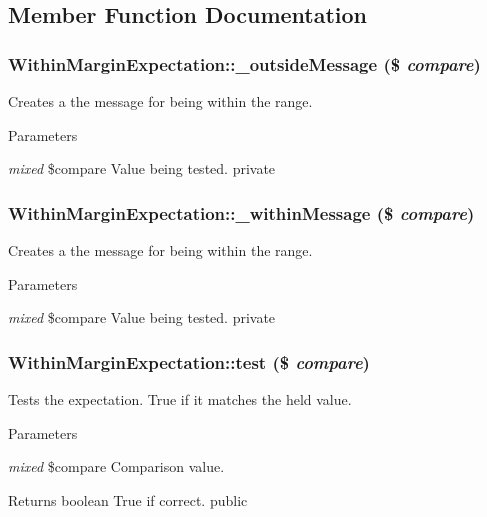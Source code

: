 \subsection{Member Function Documentation}
\hypertarget{class_within_margin_expectation_a39d1443aebe1ba7e22c14ec580a6dc1b}{
\subsubsection[{\_\-outsideMessage}]{\setlength{\rightskip}{0pt plus 5cm}WithinMarginExpectation::\_\-outsideMessage (\$ {\em compare})}}
\label{class_within_margin_expectation_a39d1443aebe1ba7e22c14ec580a6dc1b}
Creates a the message for being within the range. 
\begin{DoxyParams}{Parameters}
\item[{\em mixed}]\$compare Value being tested.  private \end{DoxyParams}
\hypertarget{class_within_margin_expectation_a1dc05788944d32ed735f353745f1270f}{
\subsubsection[{\_\-withinMessage}]{\setlength{\rightskip}{0pt plus 5cm}WithinMarginExpectation::\_\-withinMessage (\$ {\em compare})}}
\label{class_within_margin_expectation_a1dc05788944d32ed735f353745f1270f}
Creates a the message for being within the range. 
\begin{DoxyParams}{Parameters}
\item[{\em mixed}]\$compare Value being tested.  private \end{DoxyParams}
\hypertarget{class_within_margin_expectation_a3c8697495cb187b62bc6cf020e2e2ded}{
\subsubsection[{test}]{\setlength{\rightskip}{0pt plus 5cm}WithinMarginExpectation::test (\$ {\em compare})}}
\label{class_within_margin_expectation_a3c8697495cb187b62bc6cf020e2e2ded}
Tests the expectation. True if it matches the held value. 
\begin{DoxyParams}{Parameters}
\item[{\em mixed}]\$compare Comparison value. \end{DoxyParams}
\begin{DoxyReturn}{Returns}
boolean True if correct.  public 
\end{DoxyReturn}


